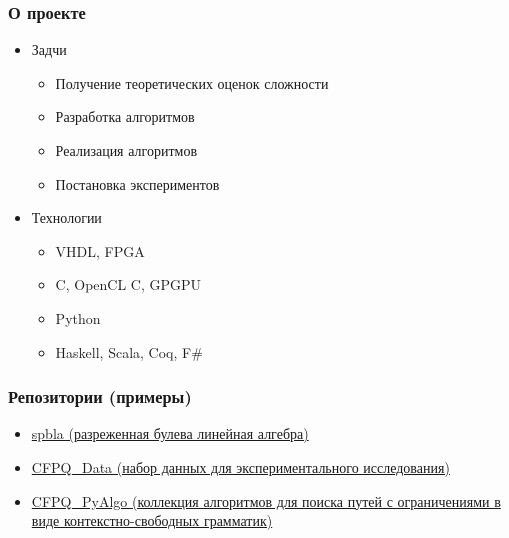 \documentclass[xcolor=table]{beamer}
\begin{document}
\begin{frame}[fragile]
\frametitle{О проекте}
\begin{itemize}

      \item Задчи
      \begin{itemize}
        \item Получение теоретических оценок сложности        
        \item Разработка алгоритмов
        \item Реализация алгоритмов
        \item Постановка экспериментов        
      \end{itemize}
      \pause
      \item Технологии
      \begin{itemize}
        \item VHDL, FPGA
        \item C, OpenCL C, GPGPU
        \item Python
        \item Haskell, Scala, Coq, F\#
      \end{itemize}
\end{itemize}    
\end{frame}


\begin{frame}[fragile]

  \frametitle{Репозитории (примеры)}
  \begin{itemize}

      \item \href{https://github.com/JetBrains-Research/spbla}{spbla (разреженная булева линейная алгебра)}
      \item \href{https://github.com/JetBrains-Research/cfpq_data}{CFPQ\_Data (набор данных для экспериментального исследования)}
      \item \href{https://github.com/JetBrains-Research/cfpq_pyalgo}{CFPQ\_PyAlgo (коллекция алгоритмов для поиска путей с ограничениями в виде контекстно-свободных грамматик)}
      
  \end{itemize}
\end{frame}
\end{document}
